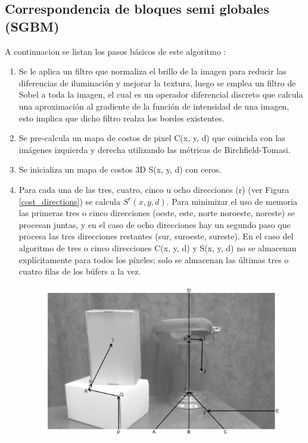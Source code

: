 \subsection{Correspondencia de bloques semi globales (SGBM)}
A continuacion se listan los pasos básicos de este algoritmo \cite{LearningOpenCV3}:
\begin{enumerate}
    \item Se le aplica un filtro que normaliza el brillo de la imagen para reducir las diferencias de iluminación y mejorar la textura, luego se emplea un filtro de Sobel a toda la imagen, el cual es un operador diferencial discreto que calcula una aproximación al gradiente de la función de intensidad de una imagen, esto implica que dicho filtro realza los bordes existentes.
    \item Se pre-calcula un mapa de costos de pixel C(x, y, d) que coincida con las imágenes
izquierda y derecha utilizando las métricas de Birchfield-Tomasi.
    \item Se inicializa un mapa de costos 3D S(x, y, d) con ceros.
    \item Para cada una de las tres, cuatro, cinco u ocho direcciones (r) (ver Figura \ref{cost_directions}) se calcula $S^{r}(x, y, d)$. Para minimizar el uso de memoria las primeras tres o cinco direcciones (oeste, este, norte noroeste, noreste) se
    procesan juntas, y en el caso de ocho direcciones hay un segundo paso que procesa
    las tres direcciones restantes (sur, suroeste, sureste). En el caso del algoritmo de
    tres o cinco direcciones C(x, y, d) y S(x, y, d) no se almacenan explícitamente para
    todos los píxeles; solo se almacenan las últimas tres o cuatro filas de los búfers a
    la vez.
    \begin{figure}[H]
        \centering
        \includegraphics[scale=0.5]{Recursos/cost_directions.jpg}

\end{figure}
\end{enumerate}
